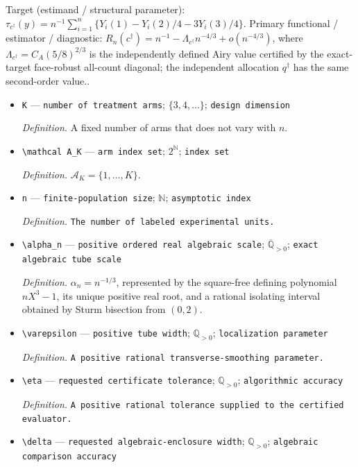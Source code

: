 \documentclass{article}
\begin{document}
Target (estimand / structural parameter): \(\tau_{c^\dagger}(y)=n^{-1}\sum_{i=1}^n\{Y_i(1)-Y_i(2)/4-3Y_i(3)/4\}\).
Primary functional / estimator / diagnostic: \(R_n(c^\dagger)=n^{-1}-\Lambda_{c^\dagger}n^{-4/3}+o(n^{-4/3})\), where \(\Lambda_{c^\dagger}=C_A(5/8)^{2/3}\) is the independently defined Airy value certified by the exact-target face-robust all-count diagonal; the independent allocation \(q^\dagger\) has the same second-order value..
\begin{itemize}
  \item \texttt{K} --- \texttt{number of treatment arms}; \(\{3,4,\ldots\}\); \texttt{design dimension}
  \par\smallskip\noindent\emph{Definition.} A fixed number of arms that does not vary with \(n\).
  \item \texttt{\textbackslash{}\allowbreak{}mathcal A\_\allowbreak{}K} --- \texttt{arm index set}; \(2^{\mathbb N}\); \texttt{index set}
  \par\smallskip\noindent\emph{Definition.} \(\mathcal A_K=\{1,\ldots,K\}\).
  \item \texttt{n} --- \texttt{finite-\allowbreak{}population size}; \(\mathbb N\); \texttt{asymptotic index}
  \par\smallskip\noindent\emph{Definition.} \texttt{The number of labeled experimental units.}
  \item \texttt{\textbackslash{}\allowbreak{}alpha\_\allowbreak{}n} --- \texttt{positive ordered real algebraic scale}; \(\overline{\mathbb Q}_{>0}\); \texttt{exact algebraic tube scale}
  \par\smallskip\noindent\emph{Definition.} \(\alpha_n=n^{-1/3}\), represented by the square-free defining polynomial \(nX^3-1\), its unique positive real root, and a rational isolating interval obtained by Sturm bisection from \((0,2)\).
  \item \texttt{\textbackslash{}\allowbreak{}varepsilon} --- \texttt{positive tube width}; \(\mathbb Q_{>0}\); \texttt{localization parameter}
  \par\smallskip\noindent\emph{Definition.} \texttt{A positive rational transverse-\allowbreak{}smoothing parameter.}
  \item \texttt{\textbackslash{}\allowbreak{}eta} --- \texttt{requested certificate tolerance}; \(\mathbb Q_{>0}\); \texttt{algorithmic accuracy}
  \par\smallskip\noindent\emph{Definition.} \texttt{A positive rational tolerance supplied to the certified evaluator.}
  \item \texttt{\textbackslash{}\allowbreak{}delta} --- \texttt{requested algebraic-\allowbreak{}enclosure width}; \(\mathbb Q_{>0}\); \texttt{algebraic comparison accuracy}

\end{itemize}
\end{document}
